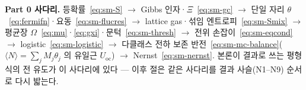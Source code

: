 \begin{keybox}
\textbf{Part 0 사다리.} 등확률~\eqref{eq:sm-S} $\to$ Gibbs 인자·$\Xi$~\eqref{eq:sm-gc} $\to$ 단일 자리
$\theta$~\eqref{eq:fermifn}·요동~\eqref{eq:sm-flucres} $\to$ lattice gas·섞임 엔트로피~\eqref{eq:sm-Smix}
$\to$ 평균장 $\Omega$~\eqref{eq:mu}·\eqref{eq:gxi}·문턱~\eqref{eq:sm-thresh} $\to$ 전위
손잡이~\eqref{eq:sm-eqcond} $\to$ logistic~\eqref{eq:sm-logistic} $\to$ 다클래스 전하 보존
반전~\eqref{eq:sm-mc-balance}($\langle N\rangle{=}\sum_jM_j\theta_j$ 의 유일근 $U_\mathrm{oc}$)
$\to$ Nernst~\eqref{eq:sm-nernst}. 본론이 결과로
쓰는 평형식의 전 유도가 이 사다리에 있다 --- 이후 절은 같은 사다리를 결과 사슬(N1--N9) 순서로
다시 밟는다.
\end{keybox}

